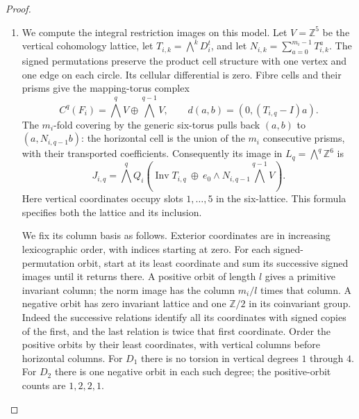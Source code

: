 \begin{proof}
\begin{enumerate}[label=\arabic*.,leftmargin=*]
\item We compute the integral restriction images on this model.
Let $V=\mathbb Z^5$ be the vertical cohomology lattice, let
$T_{i,k}=\bigwedge^kD_i^t$, and let
$N_{i,k}=\sum_{a=0}^{m_i-1}T_{i,k}^{a}$.
The signed permutations preserve the product cell structure with one
vertex and one edge on each circle.  Its cellular differential is zero.
Fibre cells and their prisms give the mapping-torus complex
\[
 C^q(F_i)=\bigwedge^qV\oplus\bigwedge^{q-1}V,
 \qquad d(a,b)=(0,(T_{i,q}-I)a).
\]
The $m_i$-fold covering by the generic six-torus pulls back
$(a,b)$ to $(a,N_{i,q-1}b)$: the horizontal cell is the union of the
$m_i$ consecutive prisms, with their transported coefficients.
Consequently its image in $L_q=\bigwedge^q\mathbb Z^6$ is
\[
 J_{i,q}=\bigwedge^q Q_i
 \left(\operatorname{Inv}T_{i,q}\ \oplus\
 e_0\wedge N_{i,q-1}\bigwedge^{q-1}V\right).
\]
Here vertical coordinates occupy slots $1,\ldots,5$ in the six-lattice.
This formula specifies both the lattice and its inclusion.

We fix its column basis as follows.  Exterior coordinates are in
increasing lexicographic order, with indices starting at zero.
For each signed-permutation orbit, start at its least coordinate
and sum its successive signed images until it returns there.
A positive orbit of length $l$ gives a primitive invariant column;
the norm image has the column $m_i/l$ times that column.
A negative orbit has zero invariant lattice and one $\mathbb Z/2$
in its coinvariant group.  Indeed the successive relations identify
all its coordinates with signed copies of the first, and the last
relation is twice that first coordinate.  Order the positive orbits
by their least coordinates, with vertical columns before horizontal
columns.  For $D_1$ there is no torsion in vertical degrees $1$ through
$4$.  For $D_2$ there is one negative orbit in each such degree; the
positive-orbit counts are $1,2,2,1$.


\end{enumerate}
\end{proof}

